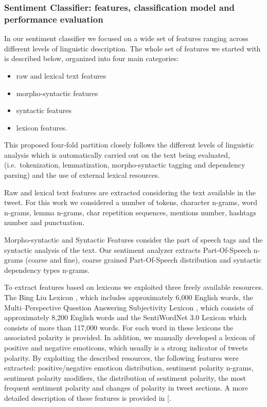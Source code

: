 \documentclass[b5paper,]{book}
\providecommand{\tightlist}{%
  \setlength{\itemsep}{0pt}\setlength{\parskip}{0pt}}
\theoremstyle{definition}
\theoremstyle{definition}
\theoremstyle{definition}
\theoremstyle{remark}
\begin{document}
\subsubsection*{Sentiment Classifier: features, classification model and
performance
evaluation}\label{sentiment-classifier-features-classification-model-and-performance-evaluation}

In our sentiment classifier we focused on a wide set of features ranging
across different levels of linguistic description. The whole set of
features we started with is described below, organized into four main
categories:

\begin{itemize}
\tightlist
\item
  raw and lexical text features
\item
  morpho-syntactic features
\item
  syntactic features
\item
  lexicon features.
\end{itemize}

This proposed four-fold partition closely follows the different levels
of linguistic analysis which is automatically carried out on the text
being evaluated, (i.e.~tokenization, lemmatization, morpho-syntactic
tagging and dependency parsing) and the use of external lexical
resources.

Raw and lexical text features are extracted considering the text
available in the tweet. For this work we considered a number of tokens,
character n-grams, word n-grams, lemma n-grams, char repetition
sequences, mentions number, hashtags number and punctuation.

Morpho-syntactic and Syntactic Features consider the part of speech tags
and the syntactic analysis of the text. Our sentiment analyzer extracts
Part-Of-Speech n-grams (coarse and fine), coarse grained Part-Of-Speech
distribution and syntactic dependency types n-grams.

To extract features based on lexicons we exploited three freely
available resources. The Bing Liu Lexicon \citep{hu2004mining}, which
includes approximately 6,000 English words, the Multi--Perspective
Question Answering Subjectivity Lexicon \citep{wilson2005recognizing},
which consists of approximately 8,200 English words and the SentiWordNet
3.0 Lexicon \citep{baccianella2010sentiwordnet} which consists of more
than 117,000 words. For each word in these lexicons the associated
polarity is provided. In addition, we manually developed a lexicon of
positive and negative emoticons, which usually is a strong indicator of
tweets polarity. By exploiting the described resources, the following
features were extracted: positive/negative emoticon distribution,
sentiment polarity n-grams, sentiment polarity modifiers, the
distribution of sentiment polarity, the most frequent sentiment polarity
and changes of polarity in tweet sections. A more detailed description
of these features is provided in {[}\citet{cimino2014linguistically}.
\end{document}
